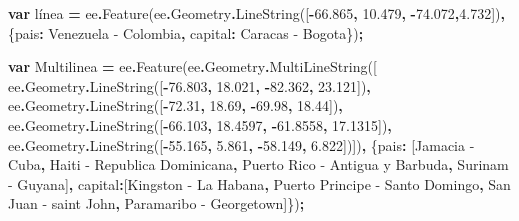 \documentclass[
  12pt,
  letterpaper,
  twoside]{book}
\newenvironment{Shaded}{\begin{snugshade}}{\end{snugshade}}
\newcommand{\AttributeTok}[1]{\textcolor[rgb]{0.77,0.63,0.00}{#1}}
\newcommand{\DataTypeTok}[1]{\textcolor[rgb]{0.13,0.29,0.53}{#1}}
\newcommand{\FloatTok}[1]{\textcolor[rgb]{0.00,0.00,0.81}{#1}}
\newcommand{\FunctionTok}[1]{\textcolor[rgb]{0.00,0.00,0.00}{#1}}
\newcommand{\KeywordTok}[1]{\textcolor[rgb]{0.13,0.29,0.53}{\textbf{#1}}}
\newcommand{\NormalTok}[1]{#1}
\newcommand{\OperatorTok}[1]{\textcolor[rgb]{0.81,0.36,0.00}{\textbf{#1}}}
\newcommand{\StringTok}[1]{\textcolor[rgb]{0.31,0.60,0.02}{#1}}
\begin{document}
\begin{Shaded}
\begin{Highlighting}[]
\KeywordTok{var}\NormalTok{ línea }\OperatorTok{=}\NormalTok{ ee}\OperatorTok{.}\FunctionTok{Feature}\NormalTok{(ee}\OperatorTok{.}\AttributeTok{Geometry}\OperatorTok{.}\FunctionTok{LineString}\NormalTok{([}\OperatorTok{{-}}\FloatTok{66.865}\OperatorTok{,} \FloatTok{10.479}\OperatorTok{,}                    
                            \OperatorTok{{-}}\FloatTok{74.072}\OperatorTok{,}\FloatTok{4.732}\NormalTok{])}\OperatorTok{,}
\NormalTok{        \{}\DataTypeTok{pais}\OperatorTok{:} \StringTok{\textquotesingle{}Venezuela {-} Colombia\textquotesingle{}}\OperatorTok{,} 
\DataTypeTok{capital}\OperatorTok{:} \StringTok{\textquotesingle{}Caracas {-} Bogota\textquotesingle{}}\NormalTok{\})}\OperatorTok{;} 

\KeywordTok{var}\NormalTok{ Multilinea }\OperatorTok{=}\NormalTok{ ee}\OperatorTok{.}\FunctionTok{Feature}\NormalTok{(ee}\OperatorTok{.}\AttributeTok{Geometry}\OperatorTok{.}\FunctionTok{MultiLineString}\NormalTok{([  }
\NormalTok{    ee}\OperatorTok{.}\AttributeTok{Geometry}\OperatorTok{.}\FunctionTok{LineString}\NormalTok{([}\OperatorTok{{-}}\FloatTok{76.803}\OperatorTok{,} \FloatTok{18.021}\OperatorTok{,} \OperatorTok{{-}}\FloatTok{82.362}\OperatorTok{,} \FloatTok{23.121}\NormalTok{])}\OperatorTok{,}      
\NormalTok{    ee}\OperatorTok{.}\AttributeTok{Geometry}\OperatorTok{.}\FunctionTok{LineString}\NormalTok{([}\OperatorTok{{-}}\FloatTok{72.31}\OperatorTok{,} \FloatTok{18.69}\OperatorTok{,} \OperatorTok{{-}}\FloatTok{69.98}\OperatorTok{,} \FloatTok{18.44}\NormalTok{])}\OperatorTok{,}        
\NormalTok{    ee}\OperatorTok{.}\AttributeTok{Geometry}\OperatorTok{.}\FunctionTok{LineString}\NormalTok{([}\OperatorTok{{-}}\FloatTok{66.103}\OperatorTok{,} \FloatTok{18.4597}\OperatorTok{,} \OperatorTok{{-}}\FloatTok{61.8558}\OperatorTok{,} \FloatTok{17.1315}\NormalTok{])}\OperatorTok{,}
\NormalTok{    ee}\OperatorTok{.}\AttributeTok{Geometry}\OperatorTok{.}\FunctionTok{LineString}\NormalTok{([}\OperatorTok{{-}}\FloatTok{55.165}\OperatorTok{,} \FloatTok{5.861}\OperatorTok{,} \OperatorTok{{-}}\FloatTok{58.149}\OperatorTok{,} \FloatTok{6.822}\NormalTok{])])}\OperatorTok{,}
\NormalTok{    \{}\DataTypeTok{pais}\OperatorTok{:}\NormalTok{  [}\StringTok{\textquotesingle{}Jamacia {-} Cuba\textquotesingle{}}\OperatorTok{,}
            \StringTok{\textquotesingle{}Haiti {-} Republica Dominicana\textquotesingle{}}\OperatorTok{,}
            \StringTok{\textquotesingle{}Puerto Rico {-} Antigua y Barbuda\textquotesingle{}}\OperatorTok{,}
            \StringTok{\textquotesingle{}Surinam {-} Guyana\textquotesingle{}}\NormalTok{]}\OperatorTok{,}
    \DataTypeTok{capital}\OperatorTok{:}\NormalTok{[}\StringTok{\textquotesingle{}Kingston {-} La Habana\textquotesingle{}}\OperatorTok{,}
            \StringTok{\textquotesingle{}Puerto Principe {-} Santo Domingo\textquotesingle{}}\OperatorTok{,}
            \StringTok{\textquotesingle{}San Juan {-} saint John\textquotesingle{}}\OperatorTok{,}
            \StringTok{\textquotesingle{}Paramaribo {-} Georgetown\textquotesingle{}}\NormalTok{]\})}\OperatorTok{;}


\end{Highlighting}
\end{Shaded}
\end{document}
